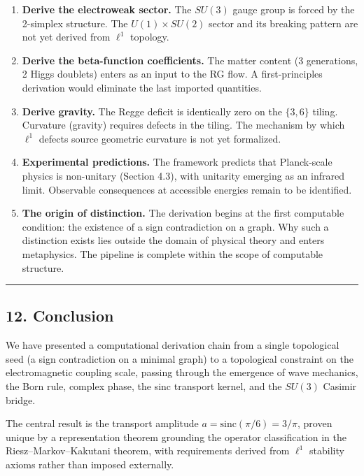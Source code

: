 \documentclass[
]{article}
\begin{document}
\begin{enumerate}
\def\labelenumi{\arabic{enumi}.}
\item
  \textbf{Derive the electroweak sector.} The \(SU(3)\) gauge group is
  forced by the 2-simplex structure. The \(U(1) \times SU(2)\) sector
  and its breaking pattern are not yet derived from \(\ell^1\) topology.
\item
  \textbf{Derive the beta-function coefficients.} The matter content (3
  generations, 2 Higgs doublets) enters as an input to the RG flow. A
  first-principles derivation would eliminate the last imported
  quantities.
\item
  \textbf{Derive gravity.} The Regge deficit is identically zero on the
  \(\{3,6\}\) tiling. Curvature (gravity) requires defects in the
  tiling. The mechanism by which \(\ell^1\) defects source geometric
  curvature is not yet formalized.
\item
  \textbf{Experimental predictions.} The framework predicts that
  Planck-scale physics is non-unitary (Section 4.3), with unitarity
  emerging as an infrared limit. Observable consequences at accessible
  energies remain to be identified.
\item
  \textbf{The origin of distinction.} The derivation begins at the first
  computable condition: the existence of a sign contradiction on a
  graph. Why such a distinction exists lies outside the domain of
  physical theory and enters metaphysics. The pipeline is complete
  within the scope of computable structure.
\end{enumerate}

\begin{center}\rule{0.5\linewidth}{0.5pt}\end{center}

\hypertarget{conclusion}{%
\subsection{12. Conclusion}\label{conclusion}}

We have presented a computational derivation chain from a single
topological seed (a sign contradiction on a minimal graph) to a
topological constraint on the electromagnetic coupling scale, passing
through the emergence of wave mechanics, the Born rule, complex phase,
the sinc transport kernel, and the \(SU(3)\) Casimir bridge.

The central result is the transport amplitude
\(a = \mathrm{sinc}(\pi/6) = 3/\pi\), proven unique by a representation
theorem grounding the operator classification in the
Riesz--Markov--Kakutani theorem, with requirements derived from
\(\ell^1\) stability axioms rather than imposed externally.
\end{document}
